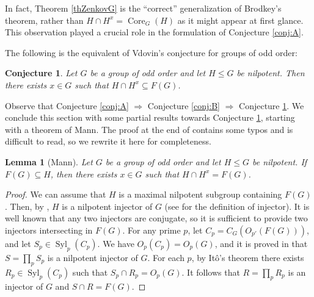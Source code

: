 \documentclass[11pt]{amsart}
\numberwithin{equation}{section}
\newtheorem{lemma}[theorem]{Lemma}
\newtheorem{conjecture}{Conjecture}
\theoremstyle{definition}
\theoremstyle{remark}
\newcommand{\Syl}{\mathop{\mathrm{Syl}}}
\newcommand{\Core}{\mathop{\mathrm{Core}}}
\begin{document}
In fact, Theorem \ref{thZenkovG} is the ``correct'' generalization of Brodkey's theorem,
rather than $H \cap H^x = \Core_G(H)$ as it might appear at first glance.
This observation played a crucial role in the formulation of Conjecture \ref{conj:A}.

The following is the equivalent of Vdovin's conjecture for groups of odd order:

\begin{conjecture} \label{conj:C}
Let $G$ be a group of odd order and let $H \leqslant G$ be nilpotent.
Then there exists $x \in G$ such that $H \cap H^x \subseteq F(G)$.
\end{conjecture}

Observe that Conjecture \ref{conj:A} $\Rightarrow$ Conjecture \ref{conj:B} $\Rightarrow$ Conjecture \ref{conj:C}.
We conclude this section with some partial results towards Conjecture \ref{conj:C}, starting with a theorem of Mann.
The proof at the end of \cite{Man75} contains some typos and is difficult to read,
so we rewrite it here for completeness.

\begin{lemma}[Mann] \label{lemInj}
Let $G$ be a group of odd order and let $H \leqslant G$ be nilpotent.
If $F(G) \subseteq H$, then there exists $x \in G$ such that $H \cap H^x =F(G)$.
\end{lemma}
\begin{proof} 
We can assume that $H$ is a maximal nilpotent subgroup containing $F(G)$.
Then, by \cite[Th. 1]{Man71}, $H$ is a nilpotent injector of $G$ (see \cite{Man71} for the definition of injector).
It is well known that any two injectors are conjugate, so it is sufficient to provide two injectors intersecting in $F(G)$.
For any prime $p$, let $C_p = C_G(O_{p'}(F(G)))$, and let $S_p \in \Syl_p(C_p)$.
We have $O_p(C_p) = O_p(G)$,
and it is proved in \cite{Man71} that $S= \prod_p S_p$ is a nilpotent injector of $G$.
For each $p$, by It\^o's theorem there exists $R_p \in \Syl_p(C_p)$ such that $S_p \cap R_p = O_p(G)$.
It follows that $R= \prod_p R_p$ is an injector of $G$ and $S \cap R=F(G)$.
\end{proof}
\end{document}

